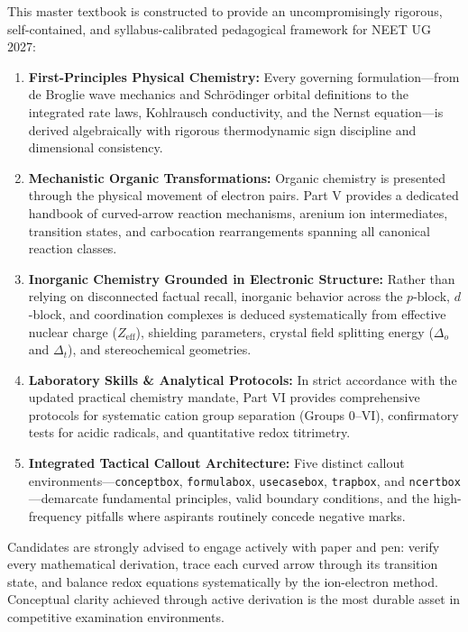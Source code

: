 \documentclass[10pt,twoside,openright]{book}
\begin{document}
This master textbook is constructed to provide an uncompromisingly rigorous, self-contained, and syllabus-calibrated pedagogical framework for NEET UG 2027:

\begin{enumerate}[leftmargin=*]
  \item \textbf{First-Principles Physical Chemistry:} Every governing formulation—from de Broglie wave mechanics and Schrödinger orbital definitions to the integrated rate laws, Kohlrausch conductivity, and the Nernst equation—is derived algebraically with rigorous thermodynamic sign discipline and dimensional consistency.
  
  \item \textbf{Mechanistic Organic Transformations:} Organic chemistry is presented through the physical movement of electron pairs. Part V provides a dedicated handbook of curved-arrow reaction mechanisms, arenium ion intermediates, transition states, and carbocation rearrangements spanning all canonical reaction classes.
  
  \item \textbf{Inorganic Chemistry Grounded in Electronic Structure:} Rather than relying on disconnected factual recall, inorganic behavior across the $p$-block, $d$-block, and coordination complexes is deduced systematically from effective nuclear charge ($Z_{\text{eff}}$), shielding parameters, crystal field splitting energy ($\Delta_o$ and $\Delta_t$), and stereochemical geometries.
  
  \item \textbf{Laboratory Skills \& Analytical Protocols:} In strict accordance with the updated practical chemistry mandate, Part VI provides comprehensive protocols for systematic cation group separation (Groups 0--VI), confirmatory tests for acidic radicals, and quantitative redox titrimetry.
  
  \item \textbf{Integrated Tactical Callout Architecture:} Five distinct callout environments—\texttt{conceptbox}, \texttt{formulabox}, \texttt{usecasebox}, \texttt{trapbox}, and \texttt{ncertbox}—demarcate fundamental principles, valid boundary conditions, and the high-frequency pitfalls where aspirants routinely concede negative marks.
\end{enumerate}

Candidates are strongly advised to engage actively with paper and pen: verify every mathematical derivation, trace each curved arrow through its transition state, and balance redox equations systematically by the ion-electron method. Conceptual clarity achieved through active derivation is the most durable asset in competitive examination environments.
\end{document}
